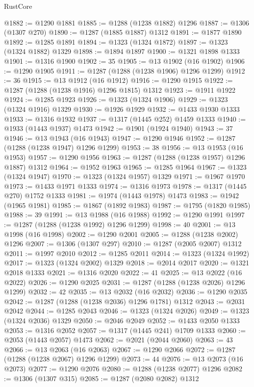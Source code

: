 \begin{lexlean}{RustCore}
\begin{coremodule}
@1882 := @1290 @1881
@1885 := @1288 (@1238 @1882) @1296
@1887 := @1306 (@1307 @270)
@1890 := @1287 (@1885 @1887) @1312
@1891 := @1877 @1890
@1892 := @1285 @1891
@1894 := @1323 (@1324 @1872)
@1897 := @1323 (@1324 @1882) @1329
@1898 := @1894 @1897
@1900 := @1321 @1898 @1333
@1901 := @1316 @1900
@1902 := 35
@1905 := @13 @1902 (@16 @1902)
@1906 := @1290 @1905
@1911 := @1287 (@1288 (@1238 @1906) @1296 @1299)
@1912 := 36
@1915 := @13 @1912 (@16 @1912)
@1916 := @1290 @1915
@1922 := @1287 (@1288 (@1238 @1916) @1296 @1815) @1312
@1923 := @1911 @1922
@1924 := @1285 @1923
@1926 := @1323 (@1324 @1906)
@1929 := @1323 (@1324 @1916) @1329
@1930 := @1926 @1929
@1932 := @1433 @1930 @1333
@1933 := @1316 @1932
@1937 := @1317 (@1445 @252) @1459 @1333
@1940 := @1933 (@1443 @1937) @1473
@1942 := @1901 (@1924 @1940)
@1943 := 37
@1946 := @13 @1943 (@16 @1943)
@1947 := @1290 @1946
@1952 := @1287 (@1288 (@1238 @1947) @1296 @1299)
@1953 := 38
@1956 := @13 @1953 (@16 @1953)
@1957 := @1290 @1956
@1963 := @1287 (@1288 (@1238 @1957) @1296 @1887) @1312
@1964 := @1952 @1963
@1965 := @1285 @1964
@1967 := @1323 (@1324 @1947)
@1970 := @1323 (@1324 @1957) @1329
@1971 := @1967 @1970
@1973 := @1433 @1971 @1333
@1974 := @1316 @1973
@1978 := @1317 (@1445 @270) @1752 @1333
@1981 := @1974 (@1443 @1978) @1473
@1983 := @1942 (@1965 @1981)
@1985 := @1867 (@1892 @1983)
@1987 := @1795 (@1820 @1985)
@1988 := 39
@1991 := @13 @1988 (@16 @1988)
@1992 := @1290 @1991
@1997 := @1287 (@1288 (@1238 @1992) @1296 @1299)
@1998 := 40
@2001 := @13 @1998 (@16 @1998)
@2002 := @1290 @2001
@2005 := @1288 (@1238 @2002) @1296
@2007 := @1306 (@1307 @297)
@2010 := @1287 (@2005 @2007) @1312
@2011 := @1997 @2010
@2012 := @1285 @2011
@2014 := @1323 (@1324 @1992)
@2017 := @1323 (@1324 @2002) @1329
@2018 := @2014 @2017
@2020 := @1321 @2018 @1333
@2021 := @1316 @2020
@2022 := 41
@2025 := @13 @2022 (@16 @2022)
@2026 := @1290 @2025
@2031 := @1287 (@1288 (@1238 @2026) @1296 @1299)
@2032 := 42
@2035 := @13 @2032 (@16 @2032)
@2036 := @1290 @2035
@2042 := @1287 (@1288 (@1238 @2036) @1296 @1781) @1312
@2043 := @2031 @2042
@2044 := @1285 @2043
@2046 := @1323 (@1324 @2026)
@2049 := @1323 (@1324 @2036) @1329
@2050 := @2046 @2049
@2052 := @1433 @2050 @1333
@2053 := @1316 @2052
@2057 := @1317 (@1445 @241) @1709 @1333
@2060 := @2053 (@1443 @2057) @1473
@2062 := @2021 (@2044 @2060)
@2063 := 43
@2066 := @13 @2063 (@16 @2063)
@2067 := @1290 @2066
@2072 := @1287 (@1288 (@1238 @2067) @1296 @1299)
@2073 := 44
@2076 := @13 @2073 (@16 @2073)
@2077 := @1290 @2076
@2080 := @1288 (@1238 @2077) @1296
@2082 := @1306 (@1307 @315)
@2085 := @1287 (@2080 @2082) @1312

\end{coremodule}
\end{lexlean}
